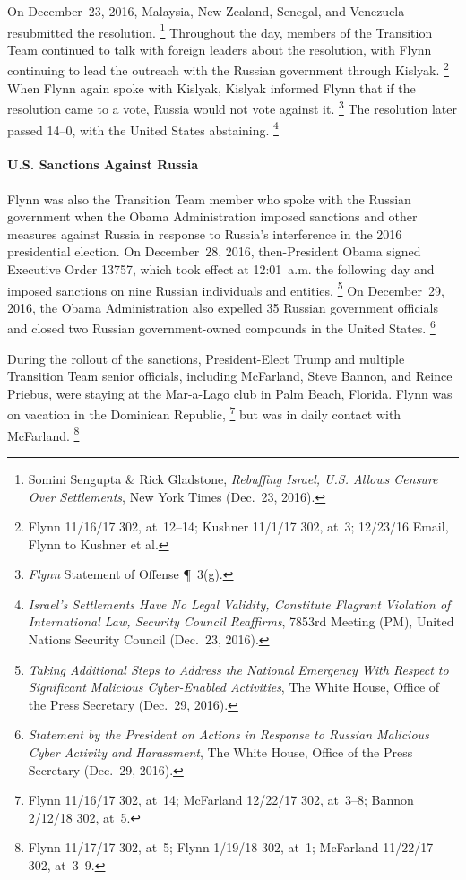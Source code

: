 On December~23, 2016, Malaysia, New Zealand, Senegal, and Venezuela resubmitted the resolution.%
\footnote{Somini Sengupta \& Rick Gladstone, \textit{Rebuffing Israel, U.S. Allows Censure Over Settlements}, New York Times (Dec.~23, 2016).}
Throughout the day, members of the Transition Team continued to talk with foreign leaders about the resolution, with Flynn continuing to lead the outreach with the Russian government through Kislyak.%
\footnote{Flynn 11/16/17 302, at~12--14;
Kushner 11/1/17 302, at~3;
12/23/16 Email, Flynn to Kushner et al.}
When Flynn again spoke with Kislyak, Kislyak informed Flynn that if the resolution came to a vote, Russia would not vote against it.%
\footnote{\textit{Flynn} Statement of Offense \P~3(g).}
The resolution later passed 14--0, with the United States abstaining.%
\footnote{\textit{Israel's Settlements Have No Legal Validity, Constitute Flagrant Violation of International Law, Security Council Reaffirms}, 7853rd Meeting (PM), United Nations Security Council (Dec.~23, 2016).}

\paragraph{U.S. Sanctions Against Russia}

Flynn was also the Transition Team member who spoke with the Russian government when the Obama Administration imposed sanctions and other measures against Russia in response to Russia's interference in the 2016 presidential election.
On December~28, 2016, then-President Obama signed Executive Order 13757, which took effect at 12:01~a.m. the following day and imposed sanctions on nine Russian individuals and entities.%
\footnote{\textit{Taking Additional Steps to Address the National Emergency With Respect to Significant Malicious Cyber-Enabled Activities}, The White House, Office of the Press Secretary (Dec.~29, 2016).}
On December~29, 2016, the Obama Administration also expelled 35 Russian government officials and closed two Russian government-owned compounds in the United States.%
\footnote{\textit{Statement by the President on Actions in Response to Russian Malicious Cyber Activity and Harassment}, The White House, Office of the Press Secretary (Dec.~29, 2016).}

During the rollout of the sanctions, President-Elect Trump and multiple Transition Team senior officials, including McFarland, Steve Bannon, and Reince Priebus, were staying at the Mar-a-Lago club in Palm Beach, Florida.
Flynn was on vacation in the Dominican Republic,%
\footnote{Flynn 11/16/17 302, at~14;
McFarland 12/22/17 302, at~3--8;
Bannon 2/12/18 302, at~5.}
but was in daily contact with McFarland.%
\footnote{Flynn 11/17/17 302, at~5;
Flynn 1/19/18 302, at~1;
McFarland 11/22/17 302, at~3--9.}

